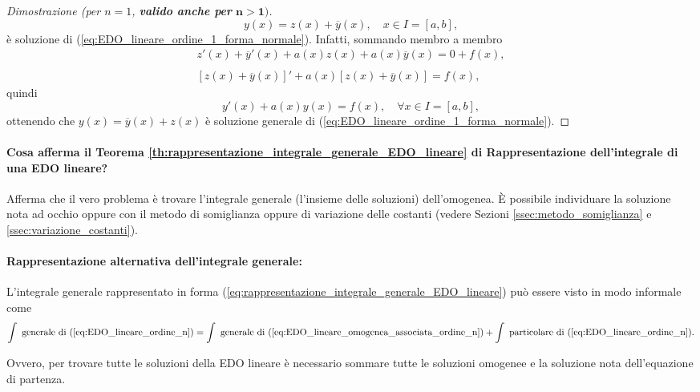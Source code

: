 \begin{proof}[Dimostrazione (per $n=1$, \textbf{valido anche per} $\boldsymbol{n>1)}$]
    \begin{equation}\label{eq:da_verificare}
        y(x)=z(x)+\overline{y}(x),\quad x\in I=[a,b],
    \end{equation}
    è soluzione di (\ref{eq:EDO_lineare_ordine_1_forma_normale}). Infatti, sommando membro a membro
    \begin{equation*}
        \begin{matrix}
            z'(x)+\overline{y}'(x)+a(x)z(x)+a(x)\overline{y}(x) = 0 + f(x),\\\\
            [z(x)+\overline{y}(x)]'+a(x)[z(x)+\overline{y}(x)] = f(x),
        \end{matrix}
    \end{equation*}
    quindi
    \begin{equation*}
        y'(x)+a(x)y(x)=f(x),\quad \forall x\in I=[a,b],
    \end{equation*}
    ottenendo che $y(x)=\overline{y}(x)+z(x)$ è soluzione generale di (\ref{eq:EDO_lineare_ordine_1_forma_normale}).
\end{proof}

\paragraph{Cosa afferma il Teorema \ref{th:rappresentazione_integrale_generale_EDO_lineare} di Rappresentazione dell'integrale di una EDO lineare?} Afferma che il vero problema è trovare l'integrale generale (l'insieme delle soluzioni) dell'omogenea. È possibile individuare la soluzione nota ad occhio oppure con il metodo di somiglianza oppure di variazione delle costanti (vedere Sezioni \ref{ssec:metodo_somiglianza} e \ref{ssec:variazione_costanti}).

\paragraph{Rappresentazione alternativa dell'integrale generale:} L'integrale generale rappresentato in forma (\ref{eq:rappresentazione_integrale_generale_EDO_lineare}) può essere visto in modo informale come
\begin{equation*}
\int \text{ generale di (\ref{eq:EDO_lineare_ordine_n})}=\int{\text{ generale di (\ref{eq:EDO_lineare_omogenea_associata_ordine_n})}} + \int\text{ particolare di (\ref{eq:EDO_lineare_ordine_n})}.
\end{equation*}

Ovvero, per trovare tutte le soluzioni della EDO lineare è necessario sommare tutte le soluzioni omogenee e la soluzione nota dell'equazione di partenza.


